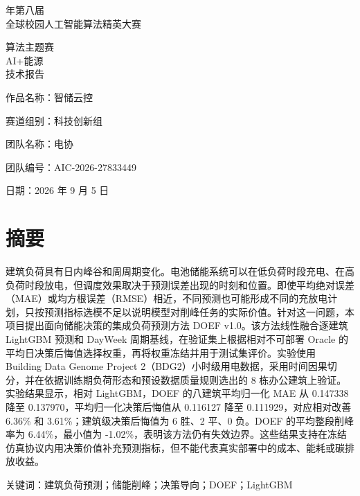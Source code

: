 \documentclass[12pt,a4paper]{article}
\begin{document}
\thispagestyle{fancy}
\vspace*{7mm}
\begin{center}
{\sffamily\fontsize{22}{30} 年第八届\\全球校园人工智能算法精英大赛\par}
\vspace{20mm}
{\sffamily\fontsize{22}{30}\selectfont 算法主题赛\\AI+能源\\技术报告\par}
\vspace{33mm}
\begin{minipage}{125mm}
\noindent 作品名称：{\sffamily\fontsize{20}{26}\selectfont 智储云控}\par\vspace{3mm}
\par\vspace{6mm}
\noindent 赛道组别：科技创新组\par\vspace{6mm}
\noindent 团队名称：电协\par\vspace{6mm}
\noindent 团队编号：AIC-2026-27833449
\end{minipage}
\vfill
{\fontsize{16}{20}\selectfont 日期：2026 年 9 月 5 日}\vspace{24mm}
\end{center}
\clearpage

\section*{摘要}
建筑负荷具有日内峰谷和周周期变化。电池储能系统可以在低负荷时段充电、在高负荷时段放电，但调度效果取决于预测误差出现的时刻和位置。即使平均绝对误差（MAE）或均方根误差（RMSE）相近，不同预测也可能形成不同的充放电计划，只按预测指标选模不足以说明模型对削峰任务的实际价值。针对这一问题，本项目提出面向储能决策的集成负荷预测方法 DOEF v1.0。该方法线性融合逐建筑 LightGBM 预测和 DayWeek 周期基线，在验证集上根据相对不可部署 Oracle 的平均日决策后悔值选择权重，再将权重冻结并用于测试集评价。实验使用 Building Data Genome Project 2（BDG2）小时级用电数据，采用时间因果切分，并在依据训练期负荷形态和预设数据质量规则选出的 8 栋办公建筑上验证。实验结果显示，相对 LightGBM，DOEF 的八建筑平均归一化 MAE 从 0.147338 降至 0.137970，平均归一化决策后悔值从 0.116127 降至 0.111929，对应相对改善 6.36\% 和 3.61\%；建筑级决策后悔值为 6 胜、2 平、0 负。DOEF 的平均整段削峰率为 6.44\%，最小值为 -1.02\%，表明该方法仍有失效边界。这些结果支持在冻结仿真协议内用决策价值补充预测指标，但不能代表真实部署中的成本、能耗或碳排放收益。\par
关键词：建筑负荷预测；储能削峰；决策导向；DOEF；LightGBM\par
\clearpage
\clearpage\tableofcontents\clearpage
\end{document}
